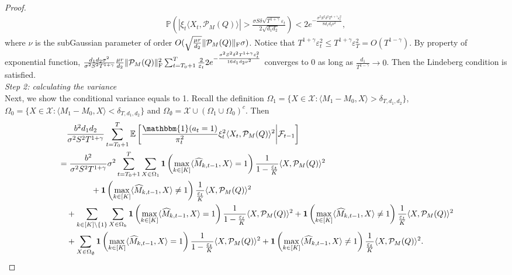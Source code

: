 \documentclass[12pt]{article}
\newcommand\fro[1]{\| #1 \|_{\rm{F}}}
\newcommand{\inp}[2]{\langle #1,#2\rangle}
\newcommand{\PP}{\mathbb{P}}
\def\EE{{\mathbb E}}
\def\PP{{\mathbb P}}
\def\indicator{\mathbf{1}}
\theoremstyle{plain}
\begin{document}
\begin{proof}
    \begin{align*}
        \PP\left(\left|\xi_t\inp{X_t}{\mathcal{P}_M(Q)}\right|> \frac{\sigma S\delta\sqrt{T^{1+\gamma}}\varepsilon_t}{2\sqrt{d_1d_2}}\right)< 2e^{-\frac{\sigma^2S^2\delta^2T^{1+\gamma}\varepsilon_t^2}{8d_1d_2\nu^2}},    
    \end{align*}
    where $\nu$ is the subGaussian parameter of order $O(\sqrt{\frac{\mu r}{d_2}}\fro{\mathcal{P}_M(Q)}\sigma)$. Notice that $T^{1+\gamma}\varepsilon_t^2\leq T^{1+\gamma}\varepsilon_T^2=O(T^{1-\gamma})$. By property of exponential function, $\frac{d_1d_2\sigma^2}{\sigma^2S^2T^{1+\gamma}} \frac{\mu r}{d_2}\fro{\mathcal{P}_M(Q)}^2\sum_{t=T_0+1}^{T} \frac{2}{\varepsilon_t}2e^{-\frac{\sigma^2S^2\delta^2T^{1+\gamma}\varepsilon_t^2}{16d_1d_2\nu^2}}$ converges to 0 as long as $\frac{d_1}{T^{1-\gamma}} \rightarrow 0$. Then the Lindeberg condition is satisfied. \\
    \emph{Step 2: calculating the variance} \\
    Next, we show the conditional variance equals to 1. Recall the definition $\Omega_1=\{X\in \mathcal{X}: \inp{M_1-M_0}{X}> \delta_{T,d_1,d_2}\}$, $\Omega_0=\{X\in \mathcal{X}: \inp{M_1-M_0}{X}< \delta_{T,d_1,d_2}\}$ and $\Omega_{\emptyset}=\mathcal{X}\cup (\Omega_1\cup\Omega_0)^c$. Then
    \begin{align*}
        &\quad \frac{b^2d_1d_2}{\sigma^2S^2T^{1+\gamma}}\sum_{t=T_0+1}^T \EE\left[\frac{\mathbbm{1}(a_t=1)}{\pi_t^2}\xi_t^2\inp{X_t}{\mathcal{P}_M(Q)}^2\bigg|\mathcal{F}_{t-1}\right] \\ 
        &= \frac{b^2}{\sigma^2S^2T^{1+\gamma}}\sigma^2 \sum_{t=T_0+1}^{T} \sum_{X\in \Omega_1} \indicator\left(\max_{k\in [K]}\inp{\widehat{M}_{k,t-1}}{X}=1\right)\frac{1}{1-\frac{\varepsilon_t}{K}}\inp{X}{\mathcal{P}_M(Q)}^2 \\ &\quad\quad\quad\quad +  \indicator\left(\max_{k\in [K]}\inp{\widehat{M}_{k,t-1}}{X}\neq 1\right)\frac{1}{\frac{\varepsilon_t}{K}}\inp{X}{\mathcal{P}_M(Q)}^2 \\ &\quad + \sum_{k \in [K]\backslash \{1\}}\sum_{X\in \Omega_k} \indicator\left(\max_{k\in [K]}\inp{\widehat{M}_{k,t-1}}{X}=1\right)\frac{1}{1-\frac{\varepsilon_t}{K}}\inp{X}{\mathcal{P}_M(Q)}^2  +  \indicator\left(\max_{k\in [K]}\inp{\widehat{M}_{k,t-1}}{X}\neq 1\right)\frac{1}{\frac{\varepsilon_t}{K}}\inp{X}{\mathcal{P}_M(Q)}^2 \\
        &\quad + \sum_{X\in \Omega_\emptyset} \indicator\left(\max_{k\in [K]}\inp{\widehat{M}_{k,t-1}}{X}=1\right)\frac{1}{1-\frac{\varepsilon_t}{K}}\inp{X}{\mathcal{P}_M(Q)}^2  +  \indicator\left(\max_{k\in [K]}\inp{\widehat{M}_{k,t-1}}{X}\neq 1\right)\frac{1}{\frac{\varepsilon_t}{K}}\inp{X}{\mathcal{P}_M(Q)}^2.

\end{align*}
\end{proof}
\end{document}
